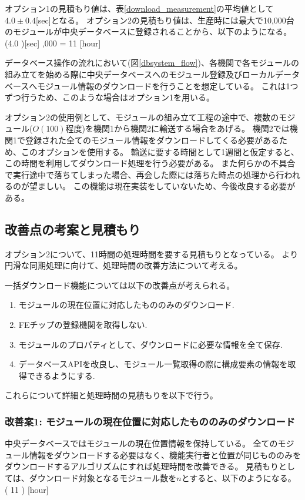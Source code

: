 オプション1の見積もり値は、表\ref{download_measurement}の平均値として$4.0\pm0.4$[sec]となる。
オプション2の見積もり値は、生産時には最大で10,000台のモジュールが中央データベースに登録されることから、以下のようになる。
\bbb
(4.0 )[\rm{sec}] ,000 = 11  [{\rm hour}]
\eee

データベース操作の流れにおいて(図\ref{dbsystem_flow})、各機関で各モジュールの組み立てを始める際に中央データベースへのモジュール登録及びローカルデータベースへモジュール情報のダウンロードを行うことを想定している。
これは1つずつ行うため、このような場合はオプション1を用いる。

オプション2の使用例として、モジュールの組み立て工程の途中で、複数のモジュール($O(100)$程度)を機関1から機関2に輸送する場合をあげる。
機関2では機関1で登録された全てのモジュール情報をダウンロードしてくる必要があるため、このオプションを使用する。
輸送に要する時間として1週間と仮定すると、この時間を利用してダウンロード処理を行う必要がある。
また何らかの不具合で実行途中で落ちてしまった場合、再会した際には落ちた時点の処理から行われるのが望ましい。
この機能は現在実装をしていないため、今後改良する必要がある。

\subsection{改善点の考案と見積もり}

オプション2について、11時間の処理時間を要する見積もりとなっている。
より円滑な同期処理に向けて、処理時間の改善方法について考える。

一括ダウンロード機能については以下の改善点が考えられる。
\begin{enumerate}
  \item モジュールの現在位置に対応したもののみのダウンロード.
  \item FEチップの登録機関を取得しない.
  \item モジュールのプロパティとして、ダウンロードに必要な情報を全て保存.
  \item データベースAPIを改良し、モジュール一覧取得の際に構成要素の情報を取得できるようにする.
\end{enumerate}

これらについて詳細と処理時間の見積もりを以下で行う。

\subsubsection{改善案1: モジュールの現在位置に対応したもののみのダウンロード}
中央データベースではモジュールの現在位置情報を保持している。
全てのモジュール情報をダウンロードする必要はなく、機能実行者と位置が同じもののみをダウンロードするアルゴリズムにすれば処理時間を改善できる。
見積もりとしては、ダウンロード対象となるモジュール数を$n$とすると、以下のようになる。
\bbb
( 11  ) \times {} [{\rm hour}]
\eee

